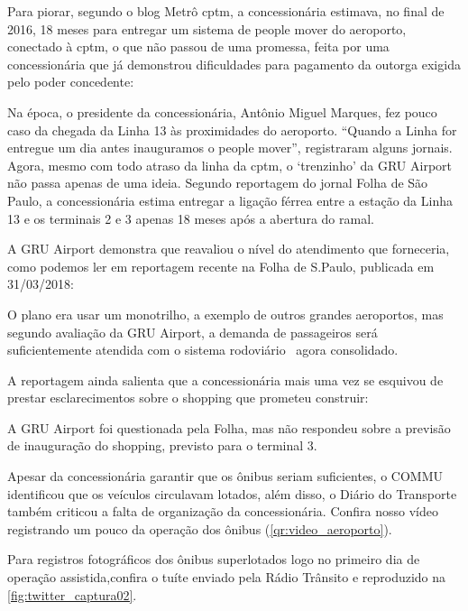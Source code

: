 \documentclass[11pt,fleqn]{book} %
\begin{document}
Para piorar, segundo o blog Metrô \gls{cptm}, a concessionária estimava, no final de 2016, 18 meses para entregar um sistema de people mover do aeroporto, conectado à \gls{cptm}, o que não passou de uma promessa, feita por uma concessionária que já demonstrou dificuldades para pagamento da outorga exigida pelo poder concedente:

\begin{citacao}
	Na época, o presidente da concessionária, Antônio Miguel Marques, fez pouco caso da chegada da Linha 13 às proximidades do aeroporto. “Quando a Linha for entregue um dia antes inauguramos o people mover”, registraram alguns jornais. Agora, mesmo com todo atraso da linha da \gls{cptm}, o ‘trenzinho’ da GRU Airport não passa apenas de uma ideia. Segundo reportagem do jornal Folha de São Paulo, a concessionária estima entregar a ligação férrea entre a estação da Linha 13 e os terminais 2 e 3 apenas 18 meses após a abertura do ramal.
\end{citacao}

A GRU Airport demonstra que reavaliou o nível do atendimento que forneceria, como podemos ler em reportagem recente na Folha de S.Paulo, publicada em 31/03/2018:

\begin{citacao}
	O plano era usar um monotrilho, a exemplo de outros grandes aeroportos, mas segundo avaliação da GRU Airport, a demanda de passageiros será suficientemente atendida com o sistema rodoviário \textemdash\ agora consolidado.
\end{citacao}

A reportagem ainda salienta que a concessionária mais uma vez se esquivou de prestar esclarecimentos sobre o shopping que prometeu construir:

\begin{citacao}
	A GRU Airport foi questionada pela Folha, mas não respondeu sobre a previsão de inauguração do shopping, previsto para o terminal 3.
\end{citacao}

Apesar da concessionária garantir que os ônibus seriam suficientes, o COMMU identificou que os veículos circulavam lotados, além disso, o Diário do Transporte também criticou a falta de organização da concessionária. Confira nosso vídeo registrando um pouco da operação dos ônibus (\autoref{qr:video_aeroporto}).

Para registros fotográficos dos ônibus superlotados logo no primeiro dia de operação assistida,confira o tuíte enviado pela Rádio Trânsito e reproduzido na \autoref{fig:twitter_captura02}.
\end{document}
